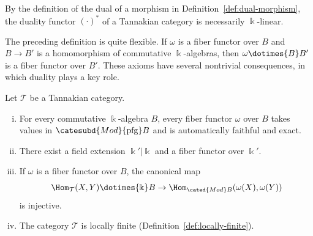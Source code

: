 By the definition of the dual of a morphism in
Definition~\ref{def:dual-morphism}, the duality functor
$(\mathord\cdot)^*$ of a Tannakian category is necessarily
$\Bbbk$-linear.

The preceding definition is quite flexible. If $\omega$ is a fiber functor
over $B$ and $B\to B'$ is a homomorphism of commutative $\Bbbk$-algebras,
then $\omega\dotimes{B}B'$ is a fiber functor over $B'$. These axioms have
several nontrivial consequences, in which duality plays a key role.

\begin{lemma}\label{prop:Tannaka-generalities}
	Let $\mathcal{T}$ be a Tannakian category.
	\begin{enumerate}[(i)]
		\item For every commutative $\Bbbk$-algebra $B$, every fiber functor
		$\omega$ over $B$ takes values in
		$\catesubd{Mod}{\mathrm{pfg}}B$ and is automatically faithful and
		exact.
		\item There exist a field extension $\Bbbk'|\Bbbk$ and a fiber functor
		over $\Bbbk'$.
		\item If $\omega$ is a fiber functor over $B$, the canonical map
		\[ \Hom_{\mathcal{T}}(X,Y)\dotimes{\Bbbk}B\to
		\Hom_{\cated{Mod}B}(\omega(X),\omega(Y)) \]
		is injective.
		\item The category $\mathcal{T}$ is locally finite
		(Definition~\ref{def:locally-finite}).
	\end{enumerate}
\end{lemma}
